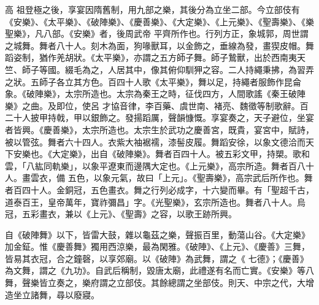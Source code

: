 
\begin{pinyinscope}

 高
 祖登極之後，享宴因隋舊制，用九部之樂，其後分為立坐二部。今立部伎有《安樂》、《太平樂》、《破陣樂》、《慶善樂》、《大定樂》、《上元樂》、《聖壽樂》、《樂聖樂》，凡八部。《安樂》者，後周武帝
 平齊所作也。行列方正，象城郭，周世謂之城舞。舞者八十人。刻木為面，狗喙獸耳，以金飾之，垂線為發，畫猰皮帽。舞蹈姿制，猶作羌胡狀。《太平樂》，亦謂之五方師子舞。師子鷙獸，出於西南夷天竺、師子等國。綴毛為之，人居其中，像其俯仰馴狎之容。二人持繩秉拂，為習弄之狀。五師子各立其方色。百四十人歌《太平樂》，舞以足，持繩者服飾作昆侖象。《破陣樂》，太宗所造也。太宗為秦王之時，征伐四方，人間歌謠《秦王破陣樂》之曲。及即位，使呂
 才協音律，李百藥、虞世南、褚亮、魏徵等制歌辭。百二十人披甲持戟，甲以銀飾之。發揚蹈厲，聲韻慷慨。享宴奏之，天子避位，坐宴者皆興。《慶善樂》，太宗所造也。太宗生於武功之慶善宮，既貴，宴宮中，賦詩，被以管弦。舞者六十四人。衣紫大袖裾襦，漆髻皮履。舞蹈安徐，以象文德洽而天下安樂也。《大定樂》，出自《破陣樂》。舞者百四十人。被五彩文甲，持槊。歌和雲，「八紘同軌樂」，以象平遼東而邊隅大定也。《上元樂》，高宗所造。舞者百八十人。畫雲衣，備
 五色，以象元氣，故曰「上元」。《聖壽樂》，高宗武后所作也。舞者百四十人。金銅冠，五色畫衣。舞之行列必成字，十六變而畢。有「聖超千古，道泰百王，皇帝萬年，寶祚彌昌」字。《光聖樂》，玄宗所造也。舞者八十人。烏冠，五彩畫衣，兼以《上元》、《聖壽》之容，以歌王跡所興。



 自《破陣舞》以下，皆雷大鼓，雜以龜茲之樂，聲振百里，動蕩山谷。《大定樂》加金鉦。惟《慶善舞》獨用西涼樂，最為閑雅。《破陣》、《上元》、《慶善》三舞，皆易其衣冠，合之鐘磬，以享郊廟。以《破陣》為武舞，謂之《
 七德》；《慶善》為文舞，謂之《九功》。自武后稱制，毀唐太廟，此禮遂有名而亡實。《安樂》等八舞，聲樂皆立奏之，樂府謂之立部伎。其餘總謂之坐部伎。則天、中宗之代，大增造坐立諸舞，尋以廢寢。




\end{pinyinscope}
